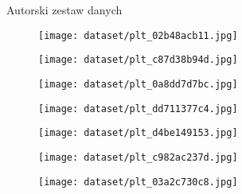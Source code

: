 \begin{easyappendix}{Autorski zestaw danych}
\begin{figure}[H]
    \end{figure}
    \begin{figure}[H]
        \centering
        \texttt{[image: dataset/plt\_02b48acb11.jpg]}
    \end{figure}
    \begin{figure}[H]
        \centering
        \texttt{[image: dataset/plt\_c87d38b94d.jpg]}
    \end{figure}
    \begin{figure}[H]
        \centering
        \texttt{[image: dataset/plt\_0a8dd7d7bc.jpg]}
    \end{figure}
    \begin{figure}[H]
        \centering
        \texttt{[image: dataset/plt\_dd711377c4.jpg]}
    \end{figure}
    \begin{figure}[H]
        \centering
        \texttt{[image: dataset/plt\_d4be149153.jpg]}
    \end{figure}
    \begin{figure}[H]
        \centering
        \texttt{[image: dataset/plt\_c982ac237d.jpg]}
    \end{figure}
    \begin{figure}[H]
        \centering
        \texttt{[image: dataset/plt\_03a2c730c8.jpg]}
    \end{figure}

\end{easyappendix}